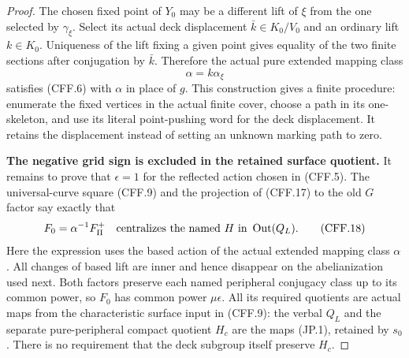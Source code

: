 \begin{proof}
The chosen fixed point of $Y_0$ may be a different lift of $\xi$
from the one selected by $\gamma_\xi$.  Select its actual deck
displacement $\bar k\in K_0/V_0$ and an ordinary lift $k\in K_0$.
Uniqueness of the lift fixing a given point gives equality of
the two finite sections after conjugation by $\bar k$.  Therefore
the actual pure extended mapping class
\[
                         \alpha=k\alpha_\xi
                                                               \tag{CFF.17}
\]
satisfies (CFF.6) with $\alpha$ in place of $g$.
This construction gives a finite procedure: enumerate the fixed
vertices in the actual finite cover, choose a path in its
one-skeleton, and use its literal point-pushing word for the deck
displacement.  It retains the displacement instead of setting
an unknown marking path to zero.

\par\medskip\noindent\textbf{The negative grid sign is excluded in the retained surface quotient.}\quad
It remains to prove that $\epsilon=1$ for the reflected action
chosen in (CFF.5).  The universal-curve square (CFF.9) and the
projection of (CFF.17) to the old $G$ factor say exactly that
\[
             F_0=\alpha^{-1}F_\Pi^+
                  \quad\hbox{centralizes the named }H
                    \hbox{ in }\operatorname{Out}(Q_L).
                                                               \tag{CFF.18}
\]
Here the expression uses the based action of the actual extended
mapping class $\alpha$.  All changes of based lift are inner
and hence disappear on the abelianization used next.
Both factors preserve each named peripheral conjugacy class up
to its common power, so $F_0$ has common power
$\mu\epsilon$.  All its required quotients are actual maps from
the characteristic surface input in (CFF.9): the verbal $Q_L$
and the separate pure-peripheral compact quotient $H_c$ are
the maps (JP.1), retained by $s_0$.
There is no requirement that the deck subgroup itself preserve
$H_c$.


\end{proof}
